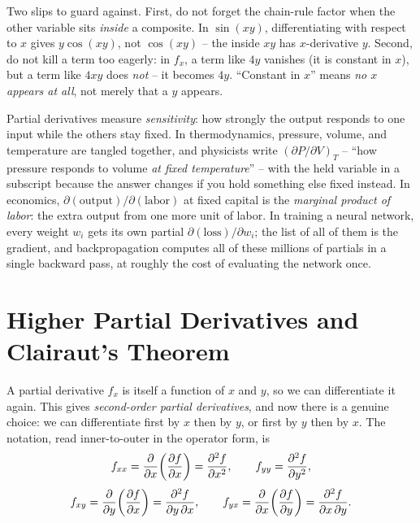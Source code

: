 \begin{trapbox}
Two slips to guard against. First, do not forget the chain-rule factor when the other variable
sits \emph{inside} a composite. In $\sin(xy)$, differentiating with respect to $x$ gives
$y\cos(xy)$, not $\cos(xy)$ -- the inside $xy$ has $x$-derivative $y$. Second, do not kill a
term too eagerly: in $f_x$, a term like $4y$ vanishes (it is constant in $x$), but a term like
$4xy$ does \emph{not} -- it becomes $4y$. ``Constant in $x$'' means \emph{no $x$ appears at
all}, not merely that a $y$ appears.
\end{trapbox}

\begin{applicationbox}
Partial derivatives measure \emph{sensitivity}: how strongly the output responds to one input
while the others stay fixed. In thermodynamics, pressure, volume, and
temperature are tangled together, and physicists write $\left(\partial P/\partial V\right)_T$
-- ``how pressure responds to volume \emph{at fixed temperature}'' -- with the held variable in
a subscript because the answer changes if you hold something else fixed instead. In
economics, $\partial(\text{output})/\partial(\text{labor})$ at fixed capital is the
\emph{marginal product of labor}: the extra output from one more unit of labor. In training a
neural network, every weight $w_i$ gets its own
partial $\partial(\text{loss})/\partial w_i$; the list of all of them is the gradient, and
backpropagation computes all of these millions of partials in a single backward pass, at
roughly the cost of evaluating the network once.
\end{applicationbox}

\section{Higher Partial Derivatives and Clairaut's Theorem}
\label{ch32:sec-higher}

A partial derivative $f_x$ is itself a function of $x$ and $y$, so we can differentiate it
again. This gives \emph{second-order partial derivatives}, and now there is a genuine choice:
we can differentiate first by $x$ then by $y$, or first by $y$ then by $x$. The notation, read
inner-to-outer in the operator form, is
\[
   f_{xx} = \frac{\partial }{\partial x}\!\left(\frac{\partial f}{\partial x}\right) = \frac{\partial^2 f}{\partial x^2},
   \qquad
   f_{yy} = \frac{\partial^2 f}{\partial y^2},
\]
\[
   f_{xy} = \frac{\partial }{\partial y}\!\left(\frac{\partial f}{\partial x}\right) = \frac{\partial^2 f}{\partial y\,\partial x},
   \qquad
   f_{yx} = \frac{\partial }{\partial x}\!\left(\frac{\partial f}{\partial y}\right) = \frac{\partial^2 f}{\partial x\,\partial y}.
\]

